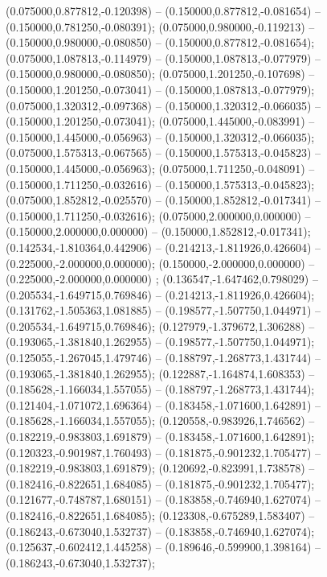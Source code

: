  (0.075000,0.877812,-0.120398) -- (0.150000,0.877812,-0.081654) -- (0.150000,0.781250,-0.080391);
 (0.075000,0.980000,-0.119213) -- (0.150000,0.980000,-0.080850) -- (0.150000,0.877812,-0.081654);
 (0.075000,1.087813,-0.114979) -- (0.150000,1.087813,-0.077979) -- (0.150000,0.980000,-0.080850);
 (0.075000,1.201250,-0.107698) -- (0.150000,1.201250,-0.073041) -- (0.150000,1.087813,-0.077979);
 (0.075000,1.320312,-0.097368) -- (0.150000,1.320312,-0.066035) -- (0.150000,1.201250,-0.073041);
 (0.075000,1.445000,-0.083991) -- (0.150000,1.445000,-0.056963) -- (0.150000,1.320312,-0.066035);
 (0.075000,1.575313,-0.067565) -- (0.150000,1.575313,-0.045823) -- (0.150000,1.445000,-0.056963);
 (0.075000,1.711250,-0.048091) -- (0.150000,1.711250,-0.032616) -- (0.150000,1.575313,-0.045823);
 (0.075000,1.852812,-0.025570) -- (0.150000,1.852812,-0.017341) -- (0.150000,1.711250,-0.032616);
 (0.075000,2.000000,0.000000) -- (0.150000,2.000000,0.000000) -- (0.150000,1.852812,-0.017341);
 (0.142534,-1.810364,0.442906) -- (0.214213,-1.811926,0.426604) -- (0.225000,-2.000000,0.000000);
 (0.150000,-2.000000,0.000000) -- (0.225000,-2.000000,0.000000) ;
 (0.136547,-1.647462,0.798029) -- (0.205534,-1.649715,0.769846) -- (0.214213,-1.811926,0.426604);
 (0.131762,-1.505363,1.081885) -- (0.198577,-1.507750,1.044971) -- (0.205534,-1.649715,0.769846);
 (0.127979,-1.379672,1.306288) -- (0.193065,-1.381840,1.262955) -- (0.198577,-1.507750,1.044971);
 (0.125055,-1.267045,1.479746) -- (0.188797,-1.268773,1.431744) -- (0.193065,-1.381840,1.262955);
 (0.122887,-1.164874,1.608353) -- (0.185628,-1.166034,1.557055) -- (0.188797,-1.268773,1.431744);
 (0.121404,-1.071072,1.696364) -- (0.183458,-1.071600,1.642891) -- (0.185628,-1.166034,1.557055);
 (0.120558,-0.983926,1.746562) -- (0.182219,-0.983803,1.691879) -- (0.183458,-1.071600,1.642891);
 (0.120323,-0.901987,1.760493) -- (0.181875,-0.901232,1.705477) -- (0.182219,-0.983803,1.691879);
 (0.120692,-0.823991,1.738578) -- (0.182416,-0.822651,1.684085) -- (0.181875,-0.901232,1.705477);
 (0.121677,-0.748787,1.680151) -- (0.183858,-0.746940,1.627074) -- (0.182416,-0.822651,1.684085);
 (0.123308,-0.675289,1.583407) -- (0.186243,-0.673040,1.532737) -- (0.183858,-0.746940,1.627074);
 (0.125637,-0.602412,1.445258) -- (0.189646,-0.599900,1.398164) -- (0.186243,-0.673040,1.532737);
